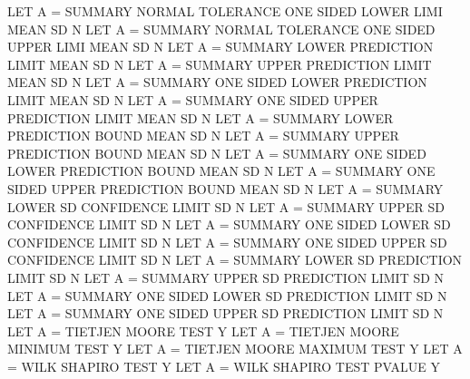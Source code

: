 {          LET A = SUMMARY NORMAL TOLERANCE ONE SIDED LOWER LIMI MEAN SD N
          LET A = SUMMARY NORMAL TOLERANCE ONE SIDED UPPER LIMI MEAN SD N
          LET A = SUMMARY LOWER PREDICTION LIMIT                MEAN SD N
          LET A = SUMMARY UPPER PREDICTION LIMIT                MEAN SD N
          LET A = SUMMARY ONE SIDED LOWER PREDICTION LIMIT      MEAN SD N
          LET A = SUMMARY ONE SIDED UPPER PREDICTION LIMIT      MEAN SD N
          LET A = SUMMARY LOWER PREDICTION BOUND                MEAN SD N
          LET A = SUMMARY UPPER PREDICTION BOUND                MEAN SD N
          LET A = SUMMARY ONE SIDED LOWER PREDICTION BOUND      MEAN SD N
          LET A = SUMMARY ONE SIDED UPPER PREDICTION BOUND      MEAN SD N
          LET A = SUMMARY LOWER SD CONFIDENCE LIMIT             SD N
          LET A = SUMMARY UPPER SD CONFIDENCE LIMIT             SD N
          LET A = SUMMARY ONE SIDED LOWER SD CONFIDENCE LIMIT   SD N
          LET A = SUMMARY ONE SIDED UPPER SD CONFIDENCE LIMIT   SD N
          LET A = SUMMARY LOWER SD PREDICTION LIMIT             SD N
          LET A = SUMMARY UPPER SD PREDICTION LIMIT             SD N
          LET A = SUMMARY ONE SIDED LOWER SD PREDICTION LIMIT   SD N
          LET A = SUMMARY ONE SIDED UPPER SD PREDICTION LIMIT   SD N
          LET A = TIETJEN MOORE TEST                            Y
          LET A = TIETJEN MOORE MINIMUM TEST                    Y
          LET A = TIETJEN MOORE MAXIMUM TEST                    Y
          LET A = WILK SHAPIRO TEST                             Y
          LET A = WILK SHAPIRO TEST PVALUE                      Y

}
